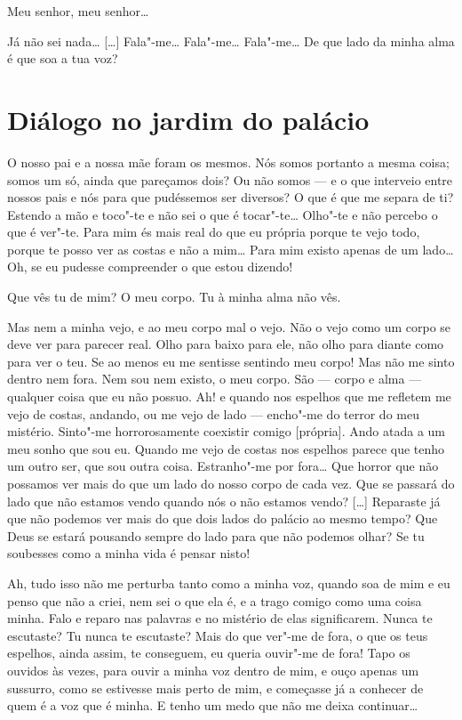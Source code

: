  Meu senhor, meu senhor\ldots{}

 Já não sei nada\ldots{} [\ldots{}] Fala"-me\ldots{} Fala"-me\ldots{} Fala"-me\ldots{}
De que lado da minha alma é que soa a tua voz?

\endgroup

\chapter[Diálogo no jardim do palácio]{Diálogo no jardim do palácio}

\begingroup
\linenumbers

 O nosso pai e a nossa mãe foram os mesmos. Nós somos portanto a
mesma coisa; somos um só, ainda que pareçamos dois? Ou não somos --- e
o que interveio entre nossos pais e nós para que pudéssemos ser
diversos? O que é que me separa de ti? Estendo a mão e toco"-te e não
sei o que é tocar"-te\ldots{} Olho"-te e não percebo o que é ver"-te. Para
mim és mais real do que eu própria porque te vejo todo, porque te
posso ver as costas e não a mim\ldots{} Para mim existo apenas de um
lado\ldots{} Oh, se eu pudesse compreender o que estou dizendo!

 Que vês tu de mim? O meu corpo. Tu à minha alma não vês.

 Mas nem a minha vejo, e ao meu corpo mal o vejo. Não o vejo como um
corpo se deve ver para parecer real. Olho para baixo para ele, não
olho para diante como para ver o teu. Se ao menos eu me sentisse
sentindo meu corpo! Mas não me sinto dentro nem fora. Nem sou nem
existo, o meu corpo. São --- corpo e alma --- qualquer coisa que eu não
possuo.  Ah! e quando nos espelhos que me refletem me
vejo de costas, andando, ou me vejo de lado --- encho"-me do terror do
meu mistério. Sinto"-me horrorosamente coexistir comigo [própria].
Ando atada a um meu sonho que sou eu. Quando me vejo de costas nos
espelhos parece que tenho um outro ser, que sou outra coisa.
Estranho"-me por fora\ldots{} Que horror que não possamos ver mais do que
um lado do nosso corpo de cada vez. Que se passará do lado que não
estamos vendo quando nós o não estamos vendo? [\ldots{}] Reparaste já que
não podemos ver mais do que dois lados do palácio ao mesmo tempo? Que
Deus se estará pousando sempre do lado para que não podemos olhar? Se
tu soubesses como a minha vida é pensar nisto! 

 Ah, tudo isso não me perturba tanto como a minha voz, quando soa de
mim e eu penso que não a criei, nem sei o que ela é, e a trago comigo
como uma coisa minha. Falo e reparo nas palavras e no mistério de
elas significarem. Nunca te escutaste? Tu nunca te escutaste? Mais do
que ver"-me de fora, o que os teus espelhos, ainda assim, te
conseguem, eu queria ouvir"-me de fora! Tapo os ouvidos às vezes, para
ouvir a minha voz dentro de mim, e ouço apenas um sussurro, como se
estivesse mais perto de mim, e começasse já a conhecer de quem é a
voz que é minha. E tenho um medo que não me deixa continuar\ldots{}

